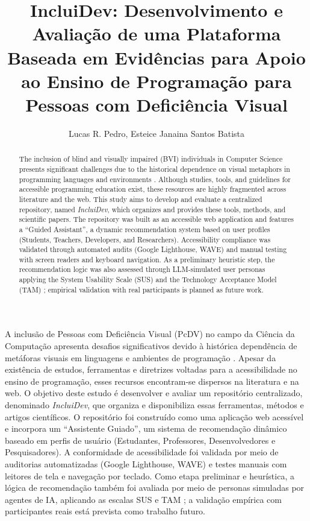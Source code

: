 \documentclass[12pt]{article}
\title{IncluiDev: Desenvolvimento e Avaliação de uma Plataforma Baseada em Evidências para Apoio ao Ensino de Programação para Pessoas com Deficiência Visual}
\author{Lucas R. Pedro\inst{1}, Esteice Janaina Santos Batista\inst{1}}
\begin{document}
 

\maketitle

\begin{abstract}
  The inclusion of blind and visually impaired (BVI) individuals in Computer Science presents significant challenges due to the historical dependence on visual metaphors in programming languages and environments \cite{stefik2013empirical}. Although studies, tools, and guidelines for accessible programming education exist, these resources are highly fragmented across literature and the web. This study aims to develop and evaluate a centralized repository, named \textit{IncluiDev}, which organizes and provides these tools, methods, and scientific papers. The repository was built as an accessible web application and features a ``Guided Assistant'', a dynamic recommendation system based on user profiles (Students, Teachers, Developers, and Researchers). Accessibility compliance was validated through automated audits (Google Lighthouse, WAVE) and manual testing with screen readers and keyboard navigation. As a preliminary heuristic step, the recommendation logic was also assessed through LLM-simulated user personas applying the System Usability Scale (SUS) \cite{brooke1996sus} and the Technology Acceptance Model (TAM) \cite{davis1989tam}; empirical validation with real participants is planned as future work.
\end{abstract}
     
\begin{resumo} 
  A inclusão de Pessoas com Deficiência Visual (PcDV) no campo da Ciência da Computação apresenta desafios significativos devido à histórica dependência de metáforas visuais em linguagens e ambientes de programação \cite{stefik2013empirical}. Apesar da existência de estudos, ferramentas e diretrizes voltadas para a acessibilidade no ensino de programação, esses recursos encontram-se dispersos na literatura e na web. O objetivo deste estudo é desenvolver e avaliar um repositório centralizado, denominado \textit{IncluiDev}, que organiza e disponibiliza essas ferramentas, métodos e artigos científicos. O repositório foi construído como uma aplicação web acessível e incorpora um ``Assistente Guiado'', um sistema de recomendação dinâmico baseado em perfis de usuário (Estudantes, Professores, Desenvolvedores e Pesquisadores). A conformidade de acessibilidade foi validada por meio de auditorias automatizadas (Google Lighthouse, WAVE) e testes manuais com leitores de tela e navegação por teclado. Como etapa preliminar e heurística, a lógica de recomendação também foi avaliada por meio de personas simuladas por agentes de IA, aplicando as escalas SUS \cite{brooke1996sus} e TAM \cite{davis1989tam}; a validação empírica com participantes reais está prevista como trabalho futuro.
\end{resumo}
\end{document}
